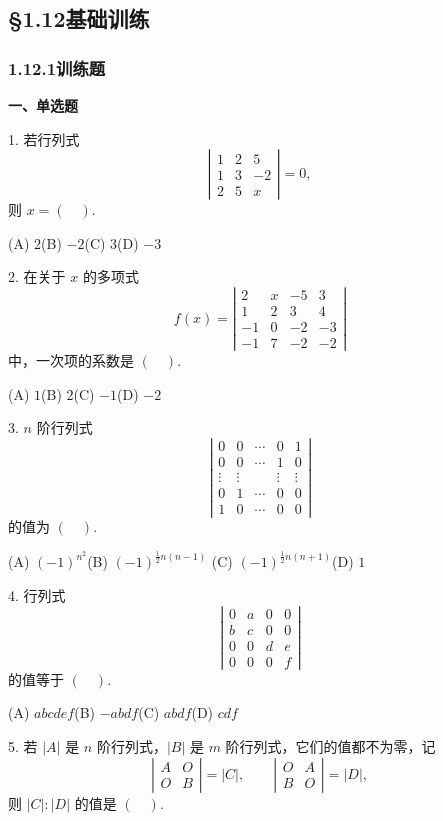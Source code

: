 \documentclass[UTF8, 12pt, fontset=fandol, oneside]{ctexart}
\begin{document}
\subsection*{§1.12\quad 基础训练}

\subsubsection*{1.12.1\quad 训练题}

\noindent\textbf{一、单选题}

1. 若行列式
\[
\left|\begin{array}{ccc}
1&2&5\\
1&3&-2\\
2&5&x
\end{array}\right|=0,
\]
则 $x=(\quad)$.

(A) $2$\qquad (B) $-2$\qquad (C) $3$\qquad (D) $-3$

2. 在关于 $x$ 的多项式
\[
f(x)=\left|\begin{array}{cccc}
2&x&-5&3\\
1&2&3&4\\
-1&0&-2&-3\\
-1&7&-2&-2
\end{array}\right|
\]
中，一次项的系数是 $(\quad)$.

(A) $1$\qquad (B) $2$\qquad (C) $-1$\qquad (D) $-2$

3. $n$ 阶行列式
\[
\left|\begin{array}{ccccc}
0&0&\cdots&0&1\\
0&0&\cdots&1&0\\
\vdots&\vdots&&\vdots&\vdots\\
0&1&\cdots&0&0\\
1&0&\cdots&0&0
\end{array}\right|
\]
的值为 $(\quad)$.

(A) $(-1)^{n^2}$\qquad (B) $(-1)^{\frac12n(n-1)}$\qquad
(C) $(-1)^{\frac12n(n+1)}$\qquad (D) $1$

4. 行列式
\[
\left|\begin{array}{cccc}
0&a&0&0\\
b&c&0&0\\
0&0&d&e\\
0&0&0&f
\end{array}\right|
\]
的值等于 $(\quad)$.

(A) $abcdef$\qquad (B) $-abdf$\qquad (C) $abdf$\qquad (D) $cdf$

5. 若 $|A|$ 是 $n$ 阶行列式，$|B|$ 是 $m$ 阶行列式，它们的值都不为零，记
\[
\left|\begin{array}{cc}A&O\\ O&B\end{array}\right|=|C|,\qquad
\left|\begin{array}{cc}O&A\\ B&O\end{array}\right|=|D|,
\]
则 $|C|:|D|$ 的值是 $(\quad)$.
\end{document}

